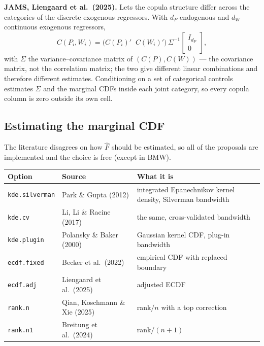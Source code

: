 \documentclass[11pt]{article}
\newcommand{\stcmd}[1]{\texttt{#1}}
\begin{document}
\textbf{JAMS, Liengaard et al.\ (2025).} Lets the copula structure differ
across the categories of the discrete exogenous regressors. With $d_P$
endogenous and $d_W$ continuous exogenous regressors,
\begin{equation}
C(P_i, W_i) = \bigl( C(P_i)' \;\; C(W_i)' \bigr)\,\Sigma^{-1}
              \begin{bmatrix} I_{d_P} \\ 0 \end{bmatrix},
\end{equation}
with $\Sigma$ the variance--covariance matrix of $(C(P), C(W))$ --- the
covariance matrix, not the correlation matrix; the two give different linear
combinations and therefore different estimates. Conditioning on a set of
categorical controls estimates $\Sigma$ and the marginal CDFs inside each joint
category, so every copula column is zero outside its own cell.

\subsection{Estimating the marginal CDF}

The literature disagrees on how $\hat F$ should be estimated, so all of the
proposals are implemented and the choice is free (except in BMW).

\begin{center}
\small
\begin{tabular}{llp{6.4cm}}
\toprule
Option & Source & What it is \\
\midrule
\stcmd{kde.silverman} & Park \& Gupta (2012)  & integrated Epanechnikov kernel density, Silverman bandwidth \\
\stcmd{kde.cv}        & Li, Li \& Racine (2017) & the same, cross-validated bandwidth \\
\stcmd{kde.plugin}    & Polansky \& Baker (2000) & Gaussian kernel CDF, plug-in bandwidth \\
\stcmd{ecdf.fixed}    & Becker et al.\ (2022) & empirical CDF with replaced boundary \\
\stcmd{ecdf.adj}      & Liengaard et al.\ (2025) & adjusted ECDF \\
\stcmd{rank.n}        & Qian, Koschmann \& Xie (2025) & rank$/n$ with a top correction \\
\stcmd{rank.n1}       & Breitung et al.\ (2024) & rank$/(n{+}1)$ \\
\bottomrule
\end{tabular}
\end{center}
\end{document}

